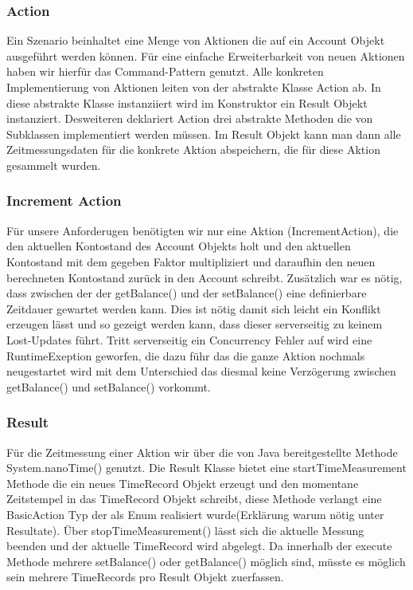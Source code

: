 \subsubsection{Action}
\label{sec:action}
Ein Szenario beinhaltet eine Menge von Aktionen die auf ein Account Objekt ausgeführt werden können. Für eine einfache Erweiterbarkeit von neuen Aktionen haben wir hierfür das Command-Pattern genutzt. Alle konkreten Implementierung von Aktionen leiten von der abstrakte Klasse Action ab. In diese abstrakte Klasse instanziiert wird im Konstruktor ein Result Objekt instanziert. Desweiteren deklariert Action drei abstrakte Methoden die von Subklassen implementiert werden müssen. Im Result Objekt kann man dann alle Zeitmessungsdaten für die konkrete Aktion abspeichern, die für diese Aktion gesammelt wurden.
 
\subsubsection{Increment Action}
\label{sec:incrementAction}
Für unsere Anforderugen benötigten wir nur eine Aktion (IncrementAction), die den aktuellen Kontostand des Account Objekts holt und den aktuellen Kontostand mit dem gegeben Faktor multipliziert und daraufhin den neuen berechneten Kontostand zurück in den Account schreibt. Zusätzlich war es nötig, dass zwischen der der getBalance() und der setBalance() eine definierbare Zeitdauer gewartet werden kann. Dies ist nötig damit sich leicht ein Konflikt erzeugen lässt und so gezeigt werden kann, dass dieser serverseitig zu keinem Lost-Updates führt. Tritt serverseitig ein Concurrency Fehler auf wird eine RuntimeExeption geworfen, die dazu führ das die ganze Aktion nochmals neugestartet wird mit dem Unterschied das diesmal keine Verzögerung zwischen getBalance() und setBalance() vorkommt.

\subsubsection{Result}
\label{sec:result}
Für die Zeitmessung einer Aktion wir über die von Java bereitgestellte Methode System.nanoTime() genutzt. Die Result Klasse bietet eine startTimeMeasurement Methode die ein neues TimeRecord Objekt erzeugt und den momentane Zeitstempel in das TimeRecord Objekt schreibt, diese Methode verlangt eine BasicAction Typ der als Enum realisiert wurde(Erklärung warum nötig unter Resultate). Über stopTimeMeasurement() lässt sich die aktuelle Messung beenden und der aktuelle TimeRecord wird abgelegt. Da innerhalb der execute Methode mehrere setBalance() oder getBalance() möglich sind, müsste es möglich sein mehrere TimeRecords pro Result Objekt zuerfassen.




